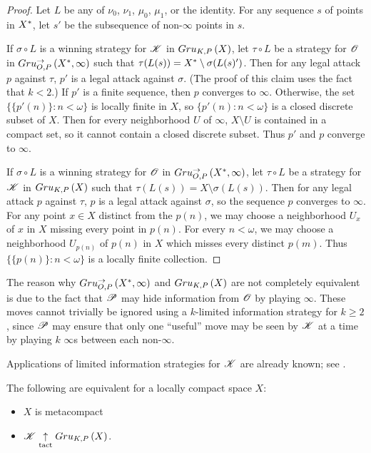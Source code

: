 \begin{proof}
  Let $L$ be any of $\nu_0$, $\nu_1$, $\mu_0$, $\mu_1$, or the identity.
  For any sequence $s$ of points in $X^*$, let $s'$ be the
  subsequence of non-$\infty$ points in $s$.

  If $\sigma\circ L$ is a winning strategy for $\mathscr{K}$ in $Gru_{K,P}\left({X}\right)$, let
  $\tau\circ L$ be a strategy for $\mathscr{O}$ in $Gru_{O,P}^{\to}\left({X^*},{\infty}\right)$
  such that $\tau(L(s)) = X^*\setminus \sigma(L(s)')$. Then for
  any legal attack $p$ against $\tau$, $p'$ is a legal attack against $\sigma$.
  (The proof of this claim uses the fact that $k<2$.)
  If $p'$ is a finite sequence, then $p$ converges to $\infty$.
  Otherwise, the set $\{\{p'(n)\}:n<\omega\}$ is locally finite in $X$, so
  $\{p'(n):n<\omega\}$ is a closed discrete subset of $X$. Then for every
  neighborhood $U$ of $\infty$, $X\setminus U$ is contained in a compact set,
  so it cannot contain a closed discrete subset. Thus $p'$ and $p$
  converge to $\infty$.

  If $\sigma\circ L$ is a winning strategy for $\mathscr{O}$ in
  $Gru_{O,P}^{\to}\left({X^*},{\infty}\right)$, let $\tau\circ L$ be a strategy for
  $\mathscr{K}$ in $Gru_{K,P}\left({X}\right)$ such that $\tau(L(s))= X\setminus\sigma(L(s))$.
  Then for any legal attack $p$ against $\tau$, $p$ is a legal attack against
  $\sigma$, so the sequence $p$ converges to $\infty$. For any point $x\in X$
  distinct from the $p(n)$, we may choose a neighborhood $U_x$ of $x$ in $X$
  missing every point in $p(n)$.
  For every $n<\omega$, we may choose a neighborhood $U_{p(n)}$ of $p(n)$ in
  $X$ which misses every distinct $p(m)$. Thus $\{\{p(n)\}:n<\omega\}$ is a
  locally finite collection.
\end{proof}

The reason why $Gru_{O,P}^{\to}\left({X^*},{\infty}\right)$ and $Gru_{K,P}\left({X}\right)$ are
not completely equivalent is due to the fact that $\mathscr{P}$ may hide information
from $\mathscr{O}$ by playing $\infty$. These moves cannot trivially be ignored
using a $k$-limited information strategy for $k\geq 2$, since $\mathscr{P}$ may
ensure that only one ``useful'' move may be seen by $\mathscr{K}$ at a time by playing
$k$ $\infty$s between each non-$\infty$.

Applications of limited information strategies for $\mathscr{K}$ are already known;
see \cite{MR858337}.

\begin{thm}
  The following are equivalent for a locally compact space $X$:
    \begin{itemize}
      \item $X$ is metacompact
      \item $\mathscr{K} \underset{\text{tact}}{\uparrow} Gru_{K,P}\left({X}\right)$.
    \end{itemize}
\end{thm}

